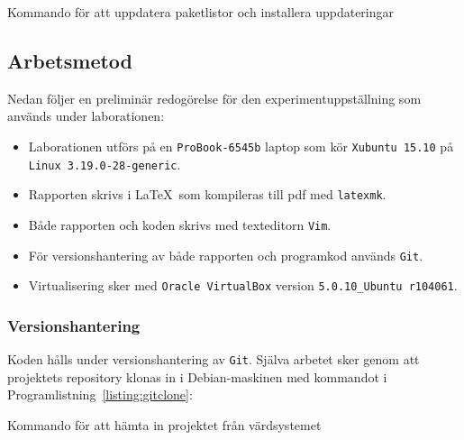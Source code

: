 \begin{listing}[H]
\caption{Kommando för att uppdatera paketlistor och installera uppdateringar}
\label{listing:apt-update}
\end{listing}



\subsection{Arbetsmetod}

Nedan följer en preliminär redogörelse för den experimentuppställning som används
under laborationen:

\begin{itemize}
  \item Laborationen utförs på en \texttt{ProBook-6545b} laptop som kör
        \texttt{Xubuntu 15.10} på \texttt{Linux 3.19.0-28-generic}.

  \item Rapporten skrivs i \LaTeX\  som kompileras till pdf med \texttt{latexmk}.

  \item Både rapporten och koden skrivs med texteditorn \texttt{Vim}.

  \item För versionshantering av både rapporten och programkod används \texttt{Git}.

  \item Virtualisering sker med \texttt{Oracle VirtualBox} version
        \texttt{5.0.10\_Ubuntu r104061}.
\end{itemize}

\subsubsection{Versionshantering}
Koden hålls under versionshantering av \texttt{Git}. Själva arbetet sker genom
att projektets repository klonas in i Debian-maskinen med kommandot i
Programlistning~\ref{listing:gitclone}:

\begin{listing}[H]
\caption{Kommando för att hämta in projektet från värdsystemet}
\label{listing:gitclone}
\end{listing}


